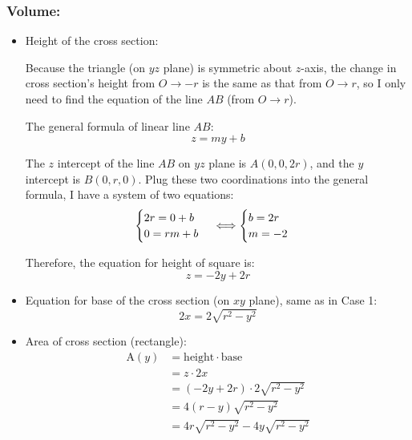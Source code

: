 \documentclass[12pt]{article}
\begin{document}
    
    
\subsubsection*{Volume:}
\begin{itemize}
    \item Height of the cross section:\par
    
    Because the triangle (on $yz$ plane) is symmetric about $z$-axis, the change in cross section's height from $O\to -r$ is the same as that from $O\to r$, so I only need to find the equation of the line $AB$ (from $O\to r$).
    
    The general formula of linear line $AB$: $$z = my + b$$ \par
    
    The $z$ intercept of the line $AB$ on $yz$ plane is $A(0,0,2r)$, and the $y$ intercept is $B(0,r,0)$. Plug these two coordinations into the general formula, I have a system of two equations:
    \begin{equation*}
        \begin{cases}
            2r=0 + b\\
            0=rm+b
        \end{cases} \\
        \Longleftrightarrow
        \begin{cases}
            b=2r\\
            m=-2
        \end{cases}
    \end{equation*}

Therefore, the equation for height of square is:
$$z=-2y+2r$$
    

    \item Equation for base of the cross section (on $xy$ plane), same as in Case 1:
    $$2x=2\sqrt{r^2-y^2}$$ \par
    
    \item Area of cross section (rectangle): 
    \begin{align*}
        \mathrm{A}(y)&=\text{height} \cdot \text{base}\\
        &=z\cdot 2x \\
        &=\left(-2y+2r\right)\cdot 2\sqrt{r^2-y^2}\\
        &= 4\left(r-y\right)\sqrt{r^2-y^2}\\
        &= 4r\sqrt{r^2-y^2}-4y\sqrt{r^2-y^2}
    \end{align*}
    

\end{itemize}
\end{document}

